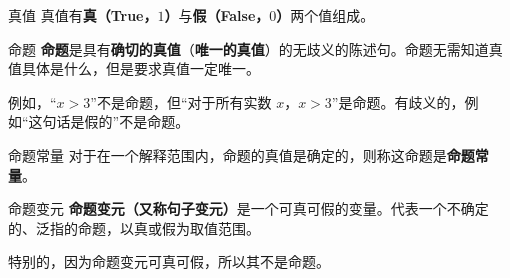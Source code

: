 
\begin{definition}{真值}
真值有\textbf{真（True，$1$）}与\textbf{假（False，$0$）}两个值组成。
\end{definition}

\begin{definition}{命题}
\textbf{命题}是具有\textbf{确切的真值}（\textbf{唯一的真值}）的无歧义的陈述句。命题无需知道真值具体是什么，但是要求真值一定唯一。
\end{definition}
例如，“$x>3$”不是命题，但“对于所有实数 $x$，$x>3$”是命题。有歧义的，例如“这句话是假的”不是命题。



\begin{definition}{命题常量}
对于在一个解释范围内，命题的真值是确定的，则称这命题是\textbf{命题常量}。
\end{definition}
\begin{definition}{命题变元}
\textbf{命题变元（又称句子变元）}是一个可真可假的变量。代表一个不确定的、泛指的命题，以真或假为取值范围。
\end{definition}
特别的，因为命题变元可真可假，所以其不是命题。
